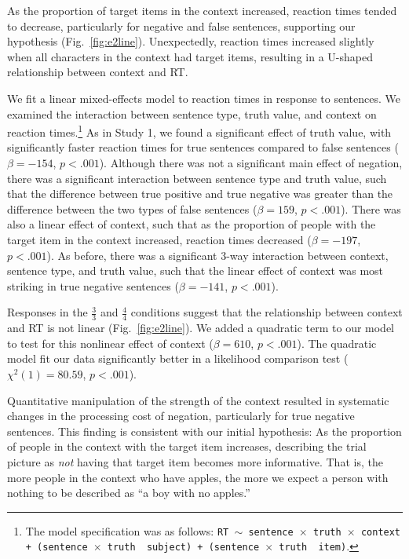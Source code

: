 \documentclass[man]{apa2}
\begin{document}
As the proportion of target items in the context increased, reaction times tended to decrease, particularly for negative and false sentences, supporting our hypothesis (Fig.\ \ref{fig:e2line}).  Unexpectedly, reaction times increased slightly when all characters in the context had target items, resulting in a U-shaped relationship between context and RT.  

We fit a linear mixed-effects model to reaction times in response to sentences.  We examined the interaction between sentence type, truth value, and context on reaction times.\footnote{The model specification was as follows: \texttt{RT $\sim$ sentence~$\times$~truth~$\times$~context + (sentence~$\times$~truth~\textbar~subject) +  (sentence~$\times$~truth~\textbar~item)}.}  As in Study 1, we found a significant effect of truth value, with significantly faster reaction times for true sentences compared to false sentences ($\beta= -154$, $p< .001$).  Although there was not a significant main effect of negation, there was a significant interaction between sentence type and truth value, such that the difference between true positive and true negative was greater than the difference between the two types of false sentences ($\beta= 159$, $p< .001$).  There was also a linear effect of context, such that as the proportion of people with the target item in the context increased, reaction times decreased ($\beta= -197$, $p< .001$).  As before, there was a significant 3-way interaction between context, sentence type, and truth value, such that the linear effect of context was most striking in true negative sentences ($\beta= -141$, $p< .001$).

Responses in the $\frac{3}{3}$ and $\frac{4}{4}$ conditions suggest that the relationship between context and RT is not linear (Fig.\ \ref{fig:e2line}).  We added a quadratic term to our model to test for this nonlinear effect of context ($\beta= 610 $, $p< .001$).  The quadratic model fit our data significantly better in a likelihood comparison test ($\chi^{2}(1) =80.59$, $p<.001$).  

Quantitative manipulation of the strength of the context resulted in systematic changes in the processing cost of negation, particularly for true negative sentences.  This finding is consistent with our initial hypothesis: As the proportion of people in the context with the target item increases, describing the trial picture as \emph{not} having that target item becomes more informative.  That is, the more people in the context who have apples, the more we expect a person with nothing to be described as ``a boy with no apples.'' 
\end{document}
